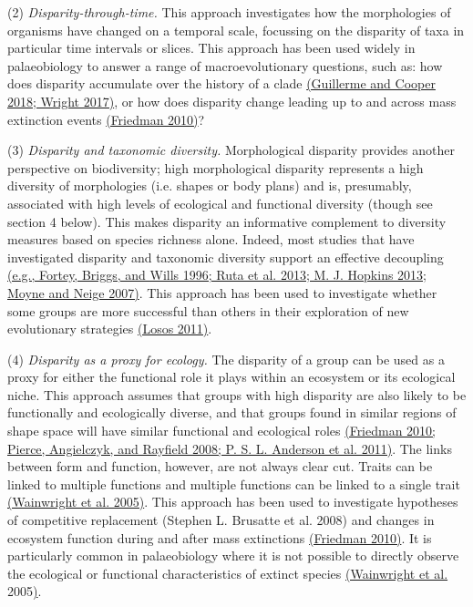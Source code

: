 (2) \emph{Disparity-through-time.} This approach investigates how the morphologies of organisms have changed on a temporal scale, focussing on the disparity of taxa in particular time intervals or slices.
This approach has been used widely in palaeobiology to answer a range of macroevolutionary questions, such as: how does disparity accumulate over the history of a clade \href{https://paperpile.com/c/sTGYvp/ekU4+s33b}{(Guillerme and Cooper 2018; Wright 2017)}, or how does disparity change leading up to and across mass extinction events \href{https://paperpile.com/c/sTGYvp/EETc}{(Friedman 2010)}?

(3) \emph{Disparity and taxonomic diversity.} Morphological disparity provides another perspective on biodiversity; high morphological disparity represents a high diversity of morphologies (i.e. shapes or body plans) and is, presumably, associated with high levels of ecological and functional diversity (though see section 4 below).
This makes disparity an informative complement to diversity measures based on species richness alone. Indeed, most studies that have investigated disparity and taxonomic diversity support an effective decoupling \href{https://paperpile.com/c/sTGYvp/2tbJ+geAO+hea5+aVVj}{(e.g., Fortey, Briggs, and Wills 1996; Ruta et al. 2013; M. J. Hopkins 2013; Moyne and Neige 2007)}.
This approach has been used to investigate whether some groups are more successful than others in their exploration of new evolutionary strategies \href{https://paperpile.com/c/sTGYvp/dJHu}{(Losos 2011)}.

(4) \emph{Disparity as a proxy for ecology.} The disparity of a group can be used as a proxy for either the functional role it plays within an ecosystem or its ecological niche.
This approach assumes that groups with high disparity are also likely to be functionally and ecologically diverse, and that groups found in similar regions of shape space will have similar functional and ecological roles \href{https://paperpile.com/c/sTGYvp/EETc+tSIy+qjj9}{(Friedman 2010; Pierce, Angielczyk, and Rayfield 2008; P. S. L. Anderson et al. 2011)}.
The links between form and function, however, are not always clear cut.
Traits can be linked to multiple functions and multiple functions can be linked to a single trait \href{https://paperpile.com/c/sTGYvp/Ejzr}{(Wainwright et al. 2005)}.
This approach has been used to investigate hypotheses of competitive replacement (Stephen L. Brusatte et al. 2008) and changes in ecosystem function during and after mass extinctions \href{https://paperpile.com/c/sTGYvp/EETc}{(Friedman 2010)}.
It is particularly common in palaeobiology where it is not possible to directly observe the ecological or functional characteristics of extinct species \href{https://paperpile.com/c/sTGYvp/Ejzr}{(Wainwright et al.} 2005\href{https://paperpile.com/c/sTGYvp/Ejzr}{)}.

